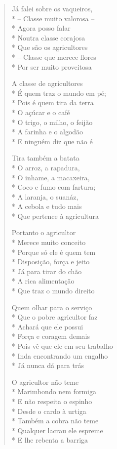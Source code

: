 \begin{verse}
Já falei sobre os vaqueiros,\\*
-- Classe muito valorosa --\\*
Agora posso falar\\*
Noutra classe corajosa\\*
Que são os agricultores\\*
-- Classe que merece flores\\*
Por ser muito proveitosa

A classe de agricultores\\*
É quem traz o mundo em pé;\\*
Pois é quem tira da terra\\*
O açúcar e o café\\*
O trigo, o milho, o feijão\\*
A farinha e o algodão\\*
E ninguém diz que não é

Tira também a batata\\*
O arroz, a rapadura,\\*
O inhame, a macaxeira,\\*
Coco e fumo com fartura;\\*
A laranja, o suanáz,\\*
A cebola e tudo mais\\*
Que pertence à agricultura

Portanto o agricultor\\*
Merece muito conceito\\*
Porque só ele é quem tem\\*
Disposição, força e jeito\\*
Já para tirar do chão\\*
A rica alimentação\\*
Que traz o mundo direito

Quem olhar para o serviço\\*
Que o pobre agricultor faz\\*
Achará que ele possui\\*
Força e coragem demais\\*
Pois vê que ele em seu trabalho\\*
Inda encontrando um engalho\\*
Já nunca dá para trás

O agricultor não teme\\*
Marimbondo nem formiga\\*
E não respeita o espinho\\*
Desde o cardo à urtiga\\*
Também a cobra não teme\\*
Qualquer lacrau ele espreme\\*
E lhe rebenta a barriga


\end{verse}
